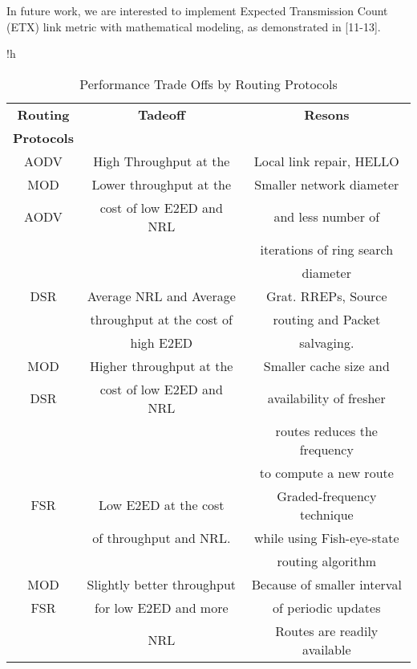 \documentclass[journal]{IEEEtran}
\begin{document}
In future work, we are interested to implement Expected Transmission Count (ETX) link metric with mathematical modeling, as demonstrated in [11-13].




\small
\vspace{0.09cm}
\begin{table}{!h}
\caption {Performance Trade Offs by Routing Protocols}
\begin {center}
\begin{tabular}{|c|c|c|}


\hline
\textbf{Routing } & \textbf{Tadeoff} & \textbf{Resons} \\
\textbf{Protocols}&&\\
\hline

AODV 	&High Throughput at the & Local link repair, HELLO \\




 MOD 	  &Lower throughput at the &	  Smaller network diameter\\
AODV&cost of low E2ED and NRL&and less number of  \\
&&iterations of ring search \\
&&diameter\\
\hline



DSR 	&Average NRL and Average& Grat. RREPs, Source\\
&throughput at the cost of& routing and Packet \\
& high E2ED	&salvaging.\\
\hline

MOD& Higher throughput at the	& Smaller cache size and\\
 DSR&	 cost of low E2ED and NRL& availability of fresher \\
&&routes reduces the frequency\\
&& to compute a new route\\
\hline



FSR 	&Low E2ED at the cost &Graded-frequency technique\\
&of throughput and NRL.	& while using Fish-eye-state \\
&&routing algorithm\\
\hline
MOD &  Slightly better throughput &	Because of smaller interval \\
 FSR	&for low E2ED and more &of periodic updates \\
 &NRL &Routes are readily available\\
\hline

\end{tabular}
\end {center}
\end {table}
\end{document}
